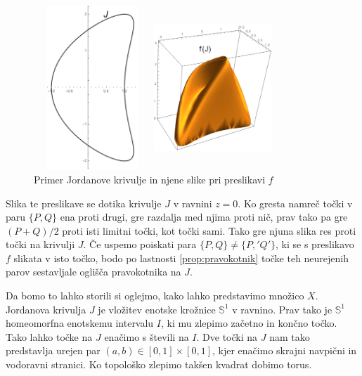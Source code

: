 \documentclass[mat1]{fmfdelo}
\begin{document}
\begin{figure}[h!]
\begin{minipage}{0.45\textwidth}
	\centering
	\includegraphics[width = 125pt, height = 175pt]{primer_krivulje.png}
\end{minipage}\hfill
\begin{minipage}{0.45\textwidth}
	\centering
	\includegraphics[width = 125pt, height = 175pt]{primer_f_krivulje.png}
\end{minipage}
\caption{Primer Jordanove krivulje in njene slike pri preslikavi $f$}
\end{figure}

Slika te preslikave se dotika krivulje $J$ v ravnini $z=0$. Ko gresta namreč točki v paru $\{P, Q\}$ ena proti drugi, gre razdalja med njima proti nič, prav tako pa gre $(P+Q)/2$ proti isti limitni točki, kot točki sami. Tako gre njuna slika res proti točki na krivulji $J$.
Če uspemo poiskati para $\{P, Q\} \neq \{P,' Q'\}$, ki se s preslikavo $f$ slikata v isto točko, bodo po lastnosti \eqref{prop:pravokotnik} točke teh neurejenih parov sestavljale oglišča pravokotnika na $J$.

Da bomo to lahko storili si oglejmo, kako lahko predstavimo množico $X$. Jordanova krivulja $J$ je vložitev enotske krožnice $\mathbb{S}^1$ v ravnino. Prav tako je $\mathbb{S}^1$ homeomorfna enotskemu intervalu $I$, ki mu zlepimo začetno in končno točko. Tako lahko točke na $J$ enačimo s števili na $I$. Dve točki na $J$ nam tako predstavlja urejen par $(a, b) \in [0, 1] \times [0, 1]$, kjer enačimo skrajni navpični in vodoravni stranici. Ko topološko zlepimo takšen kvadrat dobimo torus. 
\end{document}
